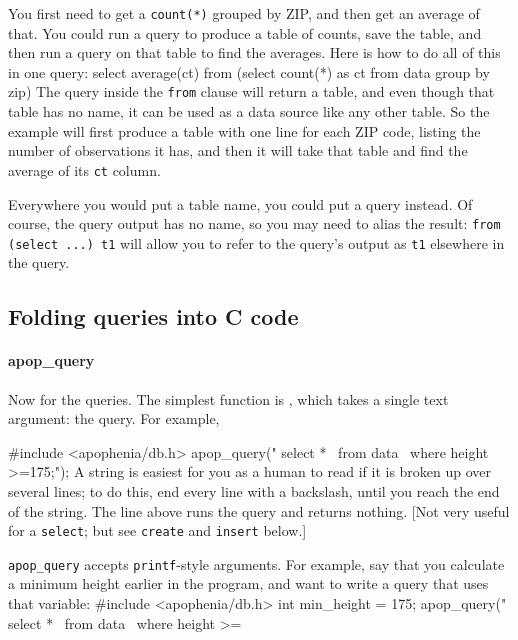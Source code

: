 You first need to get a {\tt count(*)} grouped by ZIP, and then get an
average of that. You could run a query to produce a table of counts,
save the table, and then run a query on that table to find the averages.
Here is how to do all of this in one query: 
select average(ct) 
   from (select count(*) as ct
            from data
            group by zip)
The query inside the {\tt from} clause will return a table, and even
though that table has no name, it can be used as a data source like any other
table. So the example will first produce a table with one line for each
ZIP code, listing the number of observations it has, and then it will
take that table and find the average of its {\tt ct} column.

Everywhere you would put a table name, you could put a query 
instead. Of course, the query output has no name, so you may need to
alias the result: {\tt from (select ...) t1} will allow you to refer to
the query's output as {\tt t1} elsewhere in the query.

\subsection{Folding queries into C code} 


\paragraph{apop\_query} Now for the queries. The simplest function
is , which takes a single text argument: the
query. For example,

#include <apophenia/db.h>
apop_query(" select *        \
               from data     \
                  where height >=175;");
A string is easiest for you as a human to read if it is
broken up over several lines; to do this, end every line with a
backslash, until you reach the end of the string. The line above runs
the query and returns nothing. [Not very useful for a {\tt select}; but see
{\tt create} and  {\tt insert} below.]

{\tt apop\_query} accepts {\tt printf}-style arguments. For example,
say that you calculate a minimum height earlier in the program, and want
to write a query that uses that variable:
#include <apophenia/db.h>
int min_height	= 175;
apop_query(" select *     \
               from data     \
               where height >=%

